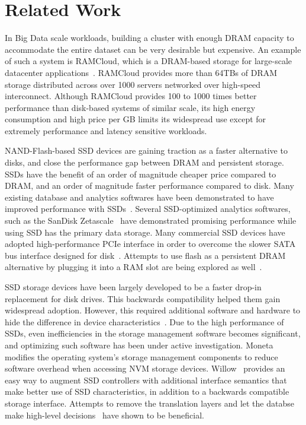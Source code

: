 
\section{Related Work}
\label{sec:related}


In Big Data scale workloads, building a cluster with enough DRAM capacity to
accommodate the entire dataset can be very desirable but expensive. An example
of such a system is RAMCloud, which is a DRAM-based storage for large-scale
datacenter applications~\cite{ramcloud, rumble_log_dram}.  RAMCloud provides more than 64TBs of DRAM
storage distributed across over 1000 servers networked over high-speed
interconnect. Although RAMCloud provides 100 to 1000 times better performance
than disk-based systems of similar scale, its high energy consumption and high
price per GB limits its widespread use except for extremely performance and
latency sensitive workloads.

NAND-Flash-based SSD devices are gaining traction as a faster alternative to
disks, and close the performance gap between DRAM and persistent storage.
SSDs have the benefit of an order of magnitude cheaper price compared to DRAM,
and an order of magnitude faster performance compared to disk.
Many existing database and analytics softwares have been demonstrated to have
improved performance with SSDs~\cite{hadoopperf,ssdhadoop,ssddatabase}.
Several SSD-optimized analytics softwares, such as the SanDisk
Zetascale~\cite{zetascale} have demonstrated promising
performance while using SSD has the primary data storage.
Many commercial SSD devices have adopted high-performance PCIe interface in
order to overcome the slower SATA bus interface designed for
disk~\cite{fusionio, violinmemory, intelnvme}. Attempts to
use flash as a persistent DRAM alternative by plugging it into a RAM slot
are being explored as well~\cite{diablotechnology}. 

SSD storage devices have been largely developed to be a faster drop-in
replacement for disk drives. This backwards compatibility helped them gain
widespread adoption.  However, this required additional software and hardware to
hide the difference in device characteristics~\cite{ssddesigntradeoff}.  Due to the high performance of
SSDs, even inefficiencies in the storage management software becomes
significant, and optimizing such software has been under active investigation.
Moneta~\cite{ucsd_moneta} modifies the operating system's storage management
components to reduce software overhead when accessing NVM storage devices.
Willow~\cite{ucsd_willow} provides an easy way to augment SSD controllers with
additional interface semantics that make better use of SSD characteristics, in
addition to a backwards compatible storage interface.  Attempts to remove the
translation layers and let the databse make high-level decisions~\cite{noftl}
have shown to be beneficial. 

